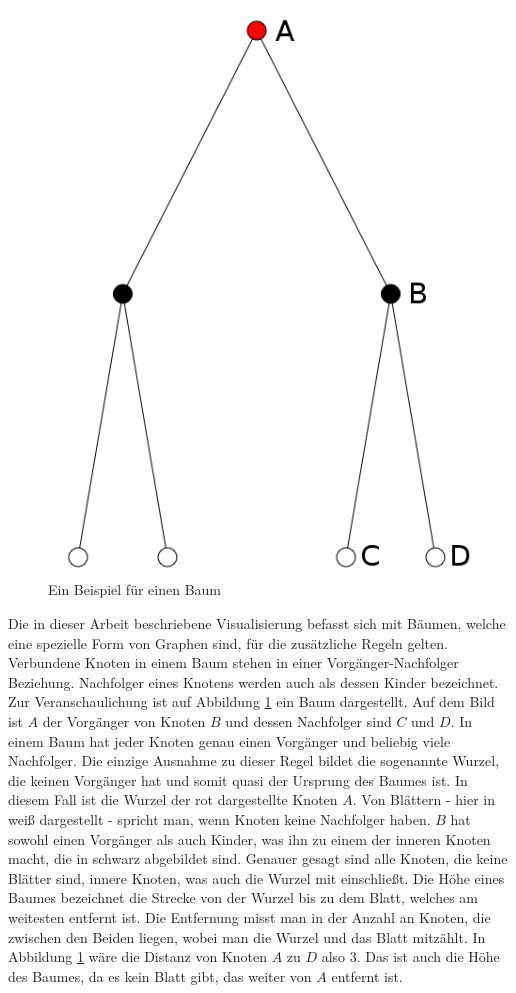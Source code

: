 \begin{figure}
\begin{minipage}{.5\textwidth}
		\includegraphics[width=.9\linewidth]{../screenshots/tree-example.PNG}
		\caption{Ein Beispiel für einen Baum}
		\label{abb:baum}
	\end{minipage}
\end{figure}
Die in dieser Arbeit beschriebene Visualisierung befasst sich mit Bäumen, welche eine spezielle Form von Graphen sind, für die zusätzliche Regeln gelten. Verbundene Knoten in einem Baum stehen in einer Vorgänger-Nachfolger Beziehung. Nachfolger eines Knotens werden auch als dessen Kinder bezeichnet. Zur Veranschaulichung ist auf Abbildung \ref{abb:baum} ein Baum dargestellt. Auf dem Bild ist $A$ der Vorgänger von Knoten $B$ und dessen Nachfolger sind $C$ und $D$. In einem Baum hat jeder Knoten genau einen Vorgänger und beliebig viele Nachfolger. Die einzige Ausnahme zu dieser Regel bildet die sogenannte Wurzel, die keinen Vorgänger hat und somit quasi der Ursprung des Baumes ist. In diesem Fall ist die Wurzel der rot dargestellte Knoten $A$. Von Blättern - hier in weiß dargestellt - spricht man, wenn Knoten keine Nachfolger haben. $B$ hat sowohl einen Vorgänger als auch Kinder, was ihn zu einem der inneren Knoten macht, die in schwarz abgebildet sind. Genauer gesagt sind alle Knoten, die keine Blätter sind, innere Knoten, was auch die Wurzel mit einschließt. Die Höhe eines Baumes bezeichnet die Strecke von der Wurzel bis zu dem Blatt, welches am weitesten entfernt ist. Die Entfernung misst man in der Anzahl an Knoten, die zwischen den Beiden liegen, wobei man die Wurzel und das Blatt mitzählt. In Abbildung \ref{abb:baum} wäre die Distanz von Knoten $A$ zu $D$ also 3. Das ist auch die Höhe des Baumes, da es kein Blatt gibt, das weiter von $A$ entfernt ist.

